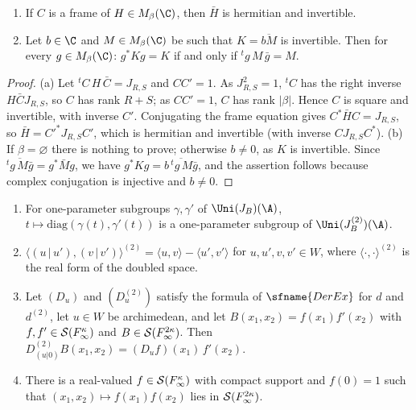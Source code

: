 \begin{lemma}[Frames]\label{pf:sh-misc:frames}
\begin{enumerate}[label=(\alph*)]
\item If $C$ is a frame of $H\in M_\beta(\C)$, then $\bar H$ is hermitian and invertible.
\item Let $b\in\C$ and $M\in M_\beta(\C)$ be such that $K=\overline{bM}$ is invertible. Then for every $g\in M_\beta(\C)$: $g^*Kg=K$ if and
only if ${}^tg\,M\,\bar g=M$.
\end{enumerate}
\end{lemma}

\begin{proof}
(a) Let ${}^tC\,H\,\bar C=J_{R,S}$ and $CC'=1$. As $J_{R,S}^2=1$, ${}^tC$ has the right inverse $H\bar CJ_{R,S}$, so $C$ has rank $R+S$; as
$CC'=1$, $C$ has rank $|\beta|$. Hence $C$ is square and invertible, with inverse $C'$. Conjugating the frame equation gives
$C^*\bar HC=J_{R,S}$, so $\bar H=C'^*J_{R,S}C'$, which is hermitian and invertible (with inverse $CJ_{R,S}C^*$).
(b) If $\beta=\varnothing$ there is nothing to prove; otherwise $b\ne0$, as $K$ is invertible. Since $\overline{{}^tg\,M\bar g}=g^*\bar Mg$, we have
$g^*Kg=\overline{b\,{}^tg\,M\bar g}$, and the assertion follows because complex conjugation is injective and $b\ne0$.
\end{proof}

\begin{lemma}[Doubling]\label{pf:sh-misc:dbl}
\begin{enumerate}[label=(C\arabic*)]
\item For one-parameter subgroups $\gamma,\gamma'$ of $\Uni(J_B)(\A)$, $t\mapsto\mathrm{diag}(\gamma(t),\gamma'(t))$ is a one-parameter subgroup of
$\Uni(J_B^{(2)})(\A)$.
\item $\langle(u\,|\,u'),(v\,|\,v')\rangle^{(2)}=\langle u,v\rangle-\langle u',v'\rangle$ for $u,u',v,v'\in W$, where $\langle\cdot,\cdot\rangle^{(2)}$
is the real form of the doubled space.
\item Let $(D_u)$ and $(D^{(2)}_u)$ satisfy the formula of $\sfname{DerEx}$ for $d$ and $d^{(2)}$, let $u\in W$ be archimedean, and let
$B(x_1,x_2)=f(x_1)f'(x_2)$ with $f,f'\in\mathcal S(F_\infty^\kappa)$ and $B\in\mathcal S(F_\infty^{2\kappa})$. Then
$D^{(2)}_{(u|0)}B(x_1,x_2)=(D_uf)(x_1)\,f'(x_2)$.
\item There is a real-valued $f\in\mathcal S(F_\infty^\kappa)$ with compact support and $f(0)=1$ such that $(x_1,x_2)\mapsto f(x_1)f(x_2)$ lies
in $\mathcal S(F_\infty^{2\kappa})$.
\end{enumerate}
\end{lemma}

